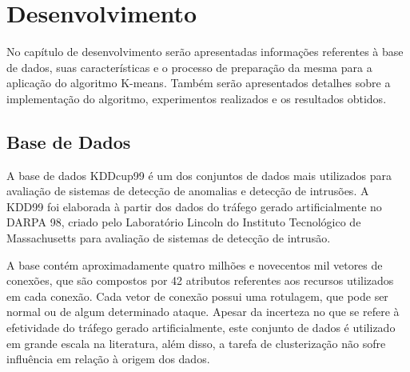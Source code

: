 \chapter{Desenvolvimento}

\indent No capítulo de desenvolvimento serão apresentadas informações referentes à base de dados, suas características e o processo de preparação da mesma para a aplicação do algoritmo K-means. Também serão apresentados detalhes sobre a implementação do algoritmo, experimentos realizados e os resultados obtidos.

  \section{Base de Dados}

\indent A base de dados KDDcup99 \cite{kdd99} é um dos conjuntos de dados mais utilizados para avaliação de sistemas de detecção de anomalias e detecção de intrusões. A KDD99 foi elaborada à partir dos dados do tráfego gerado artificialmente no DARPA 98, criado pelo Laboratório Lincoln do Instituto Tecnológico de Massachusetts para avaliação de sistemas de detecção de intrusão.

\indent A base contém aproximadamente quatro milhões e novecentos mil vetores de conexões, que são compostos por 42 atributos referentes aos recursos utilizados em cada conexão. Cada vetor de conexão possui uma rotulagem, que pode ser normal ou de algum determinado ataque. Apesar da incerteza no que se refere à efetividade do tráfego gerado artificialmente, este conjunto de dados é utilizado em grande escala na literatura, além disso, a tarefa de clusterização não sofre influência em relação à origem dos dados.

